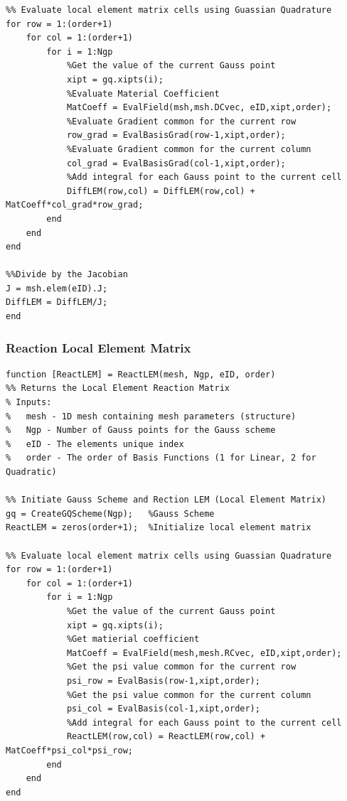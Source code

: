 \documentclass[11pt]{article}
\begin{document}
\begin{appendices}
\begin{lstlisting}
%% Evaluate local element matrix cells using Guassian Quadrature
for row = 1:(order+1)
    for col = 1:(order+1)
        for i = 1:Ngp
            %Get the value of the current Gauss point
            xipt = gq.xipts(i);
            %Evaluate Material Coefficient
            MatCoeff = EvalField(msh,msh.DCvec, eID,xipt,order);
            %Evaluate Gradient common for the current row
            row_grad = EvalBasisGrad(row-1,xipt,order);
            %Evaluate Gradient common for the current column
            col_grad = EvalBasisGrad(col-1,xipt,order);
            %Add integral for each Gauss point to the current cell
            DiffLEM(row,col) = DiffLEM(row,col) + MatCoeff*col_grad*row_grad;
        end
    end
end

%%Divide by the Jacobian
J = msh.elem(eID).J;
DiffLEM = DiffLEM/J;
end
\end{lstlisting}
\pagebreak



\subsubsection{Reaction Local Element Matrix}\label{ap:ReactLEM}

\begin{lstlisting}
function [ReactLEM] = ReactLEM(mesh, Ngp, eID, order)
%% Returns the Local Element Reaction Matrix
% Inputs:
%   mesh - 1D mesh containing mesh parameters (structure)
%   Ngp - Number of Gauss points for the Gauss scheme 
%   eID - The elements unique index
%   order - The order of Basis Functions (1 for Linear, 2 for Quadratic)

%% Initiate Gauss Scheme and Rection LEM (Local Element Matrix)
gq = CreateGQScheme(Ngp);   %Gauss Scheme
ReactLEM = zeros(order+1);  %Initialize local element matrix

%% Evaluate local element matrix cells using Guassian Quadrature
for row = 1:(order+1)
    for col = 1:(order+1)
        for i = 1:Ngp
            %Get the value of the current Gauss point
            xipt = gq.xipts(i);
            %Get matierial coefficient
            MatCoeff = EvalField(mesh,mesh.RCvec, eID,xipt,order);
            %Get the psi value common for the current row
            psi_row = EvalBasis(row-1,xipt,order);
            %Get the psi value common for the current column
            psi_col = EvalBasis(col-1,xipt,order);
            %Add integral for each Gauss point to the current cell
            ReactLEM(row,col) = ReactLEM(row,col) + MatCoeff*psi_col*psi_row;
        end
    end
end


\end{lstlisting}
\end{appendices}
\end{document}

